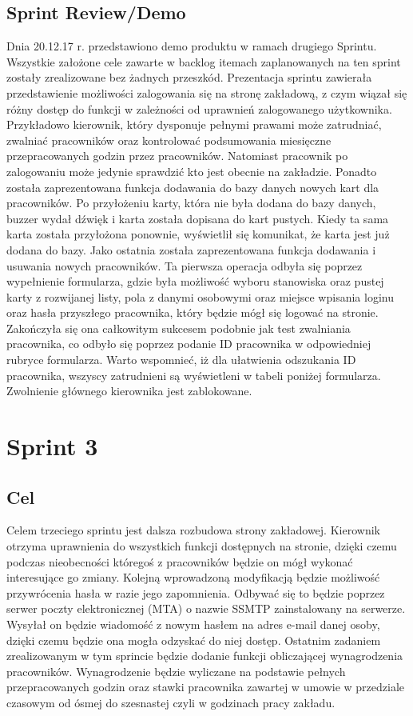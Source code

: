 \documentclass[a4paper]{article}
\begin{document}
\subsection{Sprint Review/Demo}
Dnia 20.12.17 r. przedstawiono demo produktu w ramach drugiego Sprintu. Wszystkie założone cele zawarte w backlog itemach zaplanowanych na ten sprint zostały zrealizowane bez żadnych przeszkód. Prezentacja sprintu zawierała przedstawienie możliwości zalogowania się na stronę zakładową, z czym wiązał się różny dostęp do funkcji w zależności od uprawnień zalogowanego użytkownika. Przykładowo kierownik, który dysponuje pełnymi prawami może zatrudniać, zwalniać pracowników oraz kontrolować podsumowania miesięczne przepracowanych godzin przez pracowników. Natomiast pracownik po zalogowaniu może jedynie sprawdzić kto jest obecnie na zakładzie. Ponadto została zaprezentowana funkcja dodawania do bazy danych nowych kart dla pracowników. Po przyłożeniu karty, która nie była dodana do bazy danych, buzzer wydał dźwięk i karta została dopisana do kart pustych. Kiedy ta sama karta została przyłożona ponownie, wyświetlił się komunikat, że karta jest już dodana do bazy. Jako ostatnia została zaprezentowana funkcja dodawania i usuwania nowych pracowników. Ta pierwsza operacja odbyła się poprzez wypełnienie formularza, gdzie była możliwość wyboru stanowiska oraz pustej karty z rozwijanej listy, pola z danymi osobowymi oraz miejsce wpisania loginu oraz hasła przyszłego pracownika, który będzie mógł się logować na stronie. Zakończyła się ona całkowitym sukcesem podobnie jak test zwalniania pracownika, co odbyło się poprzez podanie ID pracownika w odpowiedniej rubryce formularza. Warto wspomnieć, iż dla ułatwienia odszukania ID pracownika, wszyscy zatrudnieni są wyświetleni w tabeli poniżej formularza. Zwolnienie głównego kierownika jest zablokowane.


\section{Sprint 3}

\subsection{Cel} Celem trzeciego sprintu jest dalsza rozbudowa strony zakładowej. Kierownik otrzyma uprawnienia do wszystkich funkcji dostępnych na stronie, dzięki czemu podczas nieobecności któregoś z pracowników będzie on mógł wykonać interesujące go zmiany. Kolejną wprowadzoną modyfikacją będzie możliwość przywrócenia hasła w razie jego zapomnienia. Odbywać się to będzie poprzez serwer poczty elektronicznej (MTA) o nazwie SSMTP  zainstalowany na serwerze. Wysyłał on będzie wiadomość z nowym hasłem na adres e-mail danej osoby, dzięki czemu będzie ona mogła odzyskać do niej dostęp. Ostatnim zadaniem zrealizowanym w tym sprincie będzie dodanie funkcji obliczającej wynagrodzenia pracowników. Wynagrodzenie będzie wyliczane na podstawie pełnych przepracowanych godzin oraz stawki pracownika zawartej w umowie w przedziale czasowym od ósmej do szesnastej czyli w godzinach pracy zakładu. 
\end{document}
